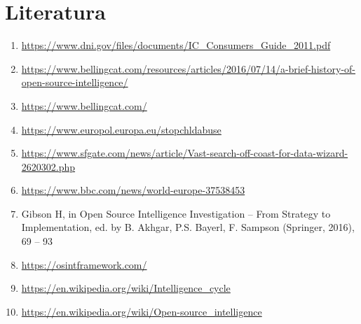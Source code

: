 \documentclass[a4paper, 11pt]{article}
\begin{document}
\section{Literatura}
\begin{enumerate}[label=(\arabic*)]
\item \url{https://www.dni.gov/files/documents/IC_Consumers_Guide_2011.pdf}
\item \url{https://www.bellingcat.com/resources/articles/2016/07/14/a-brief-history-of-open-source-intelligence/ }
\item \url{https://www.bellingcat.com/}
\item \url{https://www.europol.europa.eu/stopchldabuse}
\item \url{https://www.sfgate.com/news/article/Vast-search-off-coast-for-data-wizard-2620302.php}
\item
\url{https://www.bbc.com/news/world-europe-37538453}
\item Gibson H, in Open Source Intelligence Investigation – From Strategy to Implementation, ed. by B. Akhgar,
P.S. Bayerl, F. Sampson (Springer, 2016), 69 – 93
\item \url{https://osintframework.com/}
\item
\url{https://en.wikipedia.org/wiki/Intelligence_cycle}
\item
\url{https://en.wikipedia.org/wiki/Open-source_intelligence}
\end{enumerate}
\end{document}
